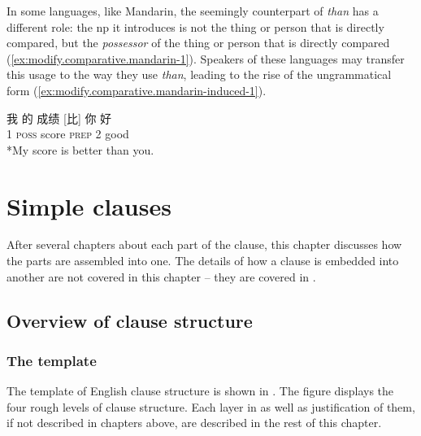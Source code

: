 \documentclass[UTF8, a4paper, oneside, scheme=plain, 12pt]{ctexbook}
\newcommand{\form}[1]{\emph{#1}}
\newcommand{\category}[1]{\textsc{#1}}
\begin{document}
In some languages, like Mandarin, 
the seemingly counterpart of \form{than} 
has a different role: 
the \acs{np} it introduces is not the thing or person that is directly compared, 
but the \emph{possessor} of the thing or person that is directly compared
(\ref{ex:modify.comparative.mandarin-1}).
Speakers of these languages may transfer this usage 
to the way they use \form{than},
leading to the rise of the ungrammatical form (\ref{ex:modify.comparative.mandarin-induced-1}).

\begin{exe}
    \ex\label{ex:modify.comparative.mandarin-1} \gll 我 的 成绩 [比] 你 好 \\
    1 \category{poss} score \category{prep} 2 good \\
    \ex\label{ex:modify.comparative.mandarin-induced-1} *My score is better than you.
\end{exe}

\chapter{Simple clauses}\label{chap:simple-clause}

After several chapters about each part of the clause,
this chapter discusses how the parts are assembled into one.
The details of how a clause is embedded into another are not covered in this chapter
-- they are covered in .

\section{Overview of clause structure}\label{sec:clause-template}

\subsection{The template}

The template of English clause structure is shown in .
The figure displays the four rough levels of clause structure.
Each layer in  as well as justification of them,
if not described in chapters above, are described 
in the rest of this chapter.
\end{document}
